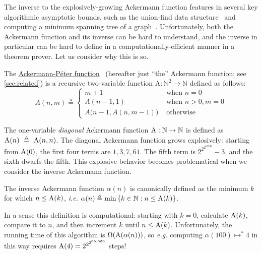 The inverse to the
explosively-growing Ackermann function features in several key algorithmic asymptotic
bounds, such as the union-find data structure~\cite{tarjan} and computing a minimum spanning
tree of a graph~\cite{chazelle}.  Unfortunately, both the Ackermann function and its inverse
can be hard to understand, and the inverse in particular can be hard to define in a computationally-efficient manner in a theorem prover.  Let us consider why this
is so.
\begin{defn} \label{defn: ack}
The \href{https://github.com/anshumanmohan/inv-ack/blob/fb8c1f625ccae7cf0c3012d926dbbf3972529d74/applications.v#L111-L120}{Ackermann-P\'eter function}~\cite{peter} (hereafter just ``the'' Ackermann function; see \cref{sec:related}) is a recursive two-variable function $\text{A} : \mathbb{N}^2 \to \mathbb{N}$ defined as follows:
\begin{equation}
\label{eq:ackermann}
A(n, m) \triangleq \begin{cases}
m + 1 & \text{ when } n = 0 \\
A(n-1, 1) & \text{ when } n > 0, m = 0 \\
A\big(n-1, A(n, m-1)\big) & \text{ otherwise}
\end{cases}
\end{equation}
\end{defn}

The one-variable \emph{diagonal} Ackermann function $\text{A} : \mathbb{N} \to \mathbb{N}$ is defined as $\text{A}(n)~\triangleq~\text{A}(n, n)$.	
The diagonal Ackermann function grows explosively: starting from $\text{A}(0)$, the first four terms are $1, 3, 7, 61$.  The fifth term is $2^{2^{2^{65536}}}-3$, and the sixth dwarfs the fifth.
This explosive behavior becomes problematical when we consider
the inverse Ackermann function\cite{chazelle, tarjan}.
\begin{defn} \label{defn: inv_ack}
The inverse Ackermann function $\alpha(n)$ is canonically defined as the minimum $k$ for which $n \le \text{A}(k)$, \emph{i.e.} $\alpha(n) \triangleq \min\left\{k\in \mathbb{N} : n \le \text{A}(k)\right\}$.
\end{defn}
In a sense this definition is computational: starting with $k=0$, calculate $\text{A}(k)$, compare
it to $n$, and then increment $k$ until $n \le \text{A}(k)$.
Unfortunately, the running time of this algorithm is $\Omega(\text{A}(\alpha(n)))$,
so \emph{e.g.} computing $\alpha(100) \mapsto^{*} 4$ in this way requires
$\text{A}(4) = 2^{2^{2^{65,536}}}$ steps!


